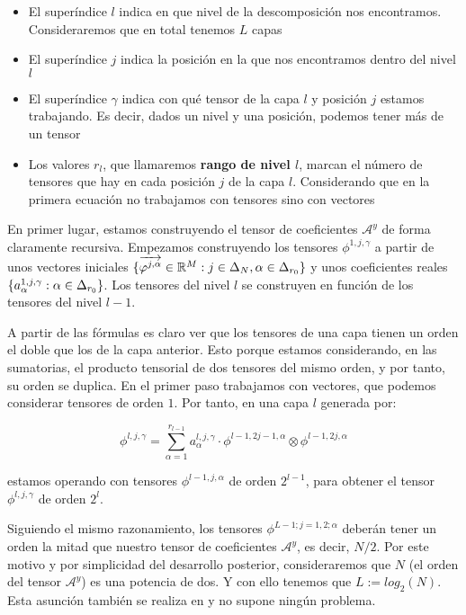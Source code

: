 \begin{itemize}
    \item El superíndice $l$ indica en que nivel de la descomposición nos encontramos. Consideraremos que en total tenemos $L$ capas
    \item El superíndice $j$ indica la posición en la que nos encontramos dentro del nivel $l$
    \item El superíndice $\gamma$ indica con qué tensor de la capa $l$ y posición $j$ estamos trabajando. Es decir, dados un nivel y una posición, podemos tener más de un tensor
    \item Los valores $r_l$, que llamaremos \textbf{rango de nivel $l$}, marcan el número de tensores que hay en cada posición $j$ de la capa $l$. Considerando que en la primera ecuación no trabajamos con tensores sino con vectores
\end{itemize}

En primer lugar, estamos construyendo el tensor de coeficientes $\mathcal{A}^y$ de forma claramente recursiva. Empezamos construyendo los tensores $\phi^{1, j, \gamma}$ a partir de unos vectores iniciales $\{\overrightarrow{\varphi^{j, \alpha}} \in \mathbb{R}^M: j \in \Delta_{N}, \alpha \in \Delta_{r_0}  \}$  y unos coeficientes reales $\{a_{\alpha}^{1, j, \gamma}: \alpha \in \Delta_{r_0}\}$. Los tensores del nivel $l$ se construyen en función de los tensores del nivel $l-1$.

A partir de las fórmulas es claro ver que los tensores de una capa tienen un orden el doble que los de la capa anterior. Esto porque estamos considerando, en las sumatorias, el producto tensorial de dos tensores del mismo orden, y por tanto, su orden se duplica. En el primer paso trabajamos con vectores, que podemos considerar tensores de orden $1$. Por tanto, en una capa $l$ generada por:

\begin{equation}
    \phi^{l, j, \gamma} = \sum_{\alpha = 1}^{r_{l-1}} a_{\alpha}^{l, j, \gamma} \cdot \phi^{l-1, 2j-1, \alpha} \otimes \phi^{l-1, 2j, \alpha}
\end{equation}

estamos operando con tensores $\phi^{l-1, j, \alpha}$ de orden $2^{l-1}$, para obtener el tensor $\phi^{l, j, \gamma}$ de orden $2^l$.

Siguiendo el mismo razonamiento, los tensores $\phi^{L-1; j = 1, 2; \alpha}$ deberán tener un orden la mitad que nuestro tensor de coeficientes $\mathcal{A}^y$, es decir, $N / 2$. Por este motivo y por simplicidad del desarrollo posterior, consideraremos que $N$ (el orden del tensor $\mathcal{A}^y$) es una potencia de dos. Y con ello tenemos que $L := log_2(N)$. Esta asunción también se realiza en \cite{matematicas:descomposicion_ht} y no supone ningún problema.

